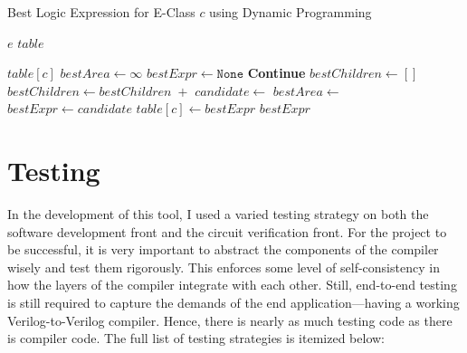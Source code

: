 \documentclass[10pt,letterpaper]{article}
\begin{document}
\begin{algorithm}
    \caption{Best Logic Expression for E-Class $c$ using Dynamic Programming}
    \label{alg:dynprog}
    \begin{algorithmic}[1]
        \Require $e$ 
        \Require $table$ 

        \State \Return $table[c]$ 
        \EndIf
        \State $bestArea \gets \infty$ 
        \State $bestExpr \gets \texttt{None}$ 
         
         
        \State \textbf{Continue}
        \EndIf
        \State $bestChildren \gets []$ 
        \State $bestChildren \gets bestChildren\; + $  
        \EndFor
        \State $candidate \gets$  
        \State $bestArea \gets$  
        \State $bestExpr \gets candidate$ 
        \EndIf
        \EndFor
        \State $table[c] \gets bestExpr$ 
        \State \Return $bestExpr$ 
        \EndFunction
    \end{algorithmic}
\end{algorithm}

\section{Testing}\label{sec:testing}

In the development of this tool, I used a varied testing strategy on both the
software development front and the circuit verification front. For the project
to be successful, it is very important to abstract the components of the
compiler wisely and test them rigorously. This enforces some level of
self-consistency in how the layers of the compiler integrate with each other.
Still, end-to-end testing is still required to capture the demands of the end
application---having a working Verilog-to-Verilog compiler. Hence, there is
nearly as much testing code as there is compiler code. The full list of testing
strategies is itemized below:
\end{document}
